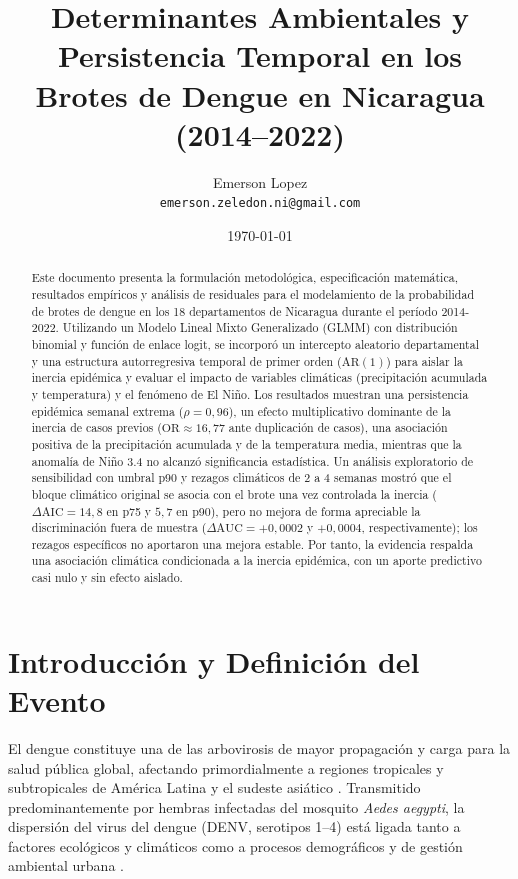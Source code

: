 \documentclass[11pt,a4paper]{article}
\title{Determinantes Ambientales y Persistencia Temporal en los Brotes de Dengue en Nicaragua (2014–2022)}
\author{
	Emerson Lopez \\
	\texttt{emerson.zeledon.ni@gmail.com}
}
\date{\today}
\begin{document}
\maketitle

\begin{abstract}
Este documento presenta la formulación metodológica, especificación matemática, resultados empíricos y análisis de residuales para el modelamiento de la probabilidad de brotes de dengue en los 18 departamentos de Nicaragua durante el período 2014-2022. Utilizando un Modelo Lineal Mixto Generalizado (GLMM) con distribución binomial y función de enlace logit, se incorporó un intercepto aleatorio departamental y una estructura autorregresiva temporal de primer orden ($\text{AR}(1)$) para aislar la inercia epidémica y evaluar el impacto de variables climáticas (precipitación acumulada y temperatura) y el fenómeno de El Niño. Los resultados muestran una persistencia epidémica semanal extrema ($\rho = 0{,}96$), un efecto multiplicativo dominante de la inercia de casos previos ($\text{OR} \approx 16{,}77$ ante duplicación de casos), una asociación positiva de la precipitación acumulada y de la temperatura media, mientras que la anomalía de Niño 3.4 no alcanzó significancia estadística. Un análisis exploratorio de sensibilidad con umbral p90 y rezagos climáticos de 2 a 4 semanas mostró que el bloque climático original se asocia con el brote una vez controlada la inercia ($\Delta\text{AIC} = 14{,}8$ en p75 y $5{,}7$ en p90), pero no mejora de forma apreciable la discriminación fuera de muestra ($\Delta\text{AUC} = +0{,}0002$ y $+0{,}0004$, respectivamente); los rezagos específicos no aportaron una mejora estable. Por tanto, la evidencia respalda una asociación climática condicionada a la inercia epidémica, con un aporte predictivo casi nulo y sin efecto aislado.
\end{abstract}

\newpage

\section{Introducción y Definición del Evento}

El dengue constituye una de las arbovirosis de mayor propagación y carga para la salud pública global, afectando primordialmente a regiones tropicales y subtropicales de América Latina y el sudeste asiático \parencite{bhatt2013global}. Transmitido predominantemente por hembras infectadas del mosquito \textit{Aedes aegypti}, la dispersión del virus del dengue (DENV, serotipos 1--4) está ligada tanto a factores ecológicos y climáticos como a procesos demográficos y de gestión ambiental urbana \parencite{brady2012refined, morin2013climate}.
\end{document}
